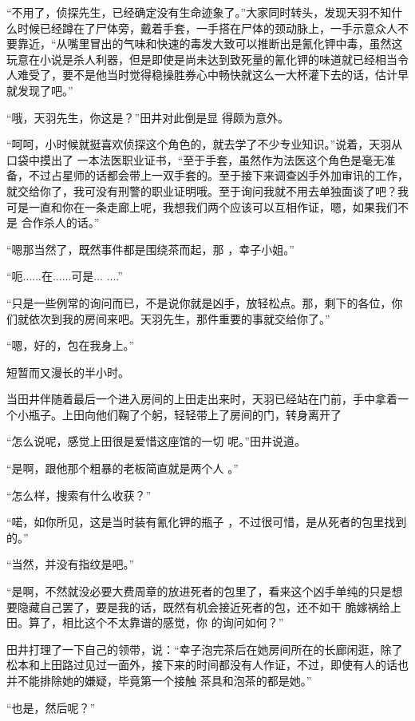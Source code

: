 \documentclass{article}
\begin{document}
“不用了，侦探先生，已经确定没有生命迹象了。”大家同时转头，发现天羽不知什么时候已经蹲在了尸体旁，戴着手套，一手搭在尸体的颈动脉上，一手示意众人不要靠近，“从嘴里冒出的气味和快速的毒发大致可以推断出是氰化钾中毒，虽然这玩意在小说是杀人利器，但是即使是尚未达到致死量的氰化钾的味道就已经相当令人难受了，要不是他当时觉得稳操胜券心中畅快就这么一大杯灌下去的话，估计早
就发现了吧。” 

“哦，天羽先生，你这是？”田井对此倒是显
得颇为意外。 

“呵呵，小时候就挺喜欢侦探这个角色的，就去学了不少专业知识。”说着，天羽从口袋中摸出了
\newpage
一本法医职业证书，“至于手套，虽然作为法医这个角色是毫无准备，不过占星师的话都会带上一双手套的。至于接下来调查凶手外加审讯的工作，就交给你了，我可没有刑警的职业证明哦。至于询问我就不用去单独面谈了吧？我可是一直和你在一条走廊上呢，我想我们两个应该可以互相作证，嗯，如果我们不是
合作杀人的话。” 

“嗯那当然了，既然事件都是围绕茶而起，那
，幸子小姐。” 

“呃......在......可是...
....” 

“只是一些例常的询问而已，不是说你就是凶手，放轻松点。那，剩下的各位，你们就依次到我的房间来吧。天羽先生，那件重要的事就交给你了。”


“嗯，好的，包在我身上。” 


\newpage

短暂而又漫长的半小时。 

当田井伴随着最后一个进入房间的上田走出来时，天羽已经站在门前，手中拿着一个小瓶子。上田向他们鞠了个躬，轻轻带上了房间的门，转身离开了

“怎么说呢，感觉上田很是爱惜这座馆的一切
呢。”田井说道。 

“是啊，跟他那个粗暴的老板简直就是两个人
。” 


“怎么样，搜索有什么收获？” 

“喏，如你所见，这是当时装有氰化钾的瓶子
，不过很可惜，是从死者的包里找到的。” 


“当然，并没有指纹是吧。” 

“是啊，不然就没必要大费周章的放进死者的包里了，看来这个凶手单纯的只是想要隐藏自己罢了，要是我的话，既然有机会接近死者的包，还不如干
\newpage
脆嫁祸给上田。算了，相比这个不太靠谱的感觉，你
的询问如何？” 

田井打理了一下自己的领带，说：“幸子泡完茶后在她房间所在的长廊闲逛，除了松本和上田路过见过一面外，接下来的时间都没有人作证，不过，即使有人的话也并不能排除她的嫌疑，毕竟第一个接触
茶具和泡茶的都是她。” 


“也是，然后呢？” 
\end{document}
